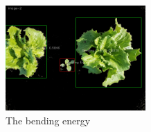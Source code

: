 \documentclass[letterpaper]{report}
\begin{document}
{%

\begin{figure}[h!]
	\centering
	\includegraphics[height=4cm]{./figures/shape-bending.jpg}
	\caption[Shape attribute: Bending Energy]{The bending energy}
	\label{fig:shape-bending}
\end{figure}

}
\end{document}
